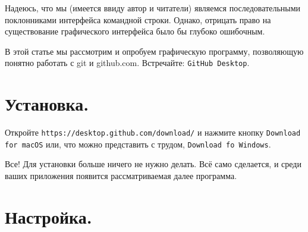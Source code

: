\documentclass[12pt,a4paper]{article}
\begin{document}
Надеюсь, что мы (имеется ввиду автор и читатели) являемся последовательными поклонниками
интерфейса командной строки. Однако, отрицать право на существование графического интерфейса было бы
глубоко ошибочным.

В этой статье мы рассмотрим и опробуем графическую программу, позволяющую понятно работать
с git и github.com. Встречайте: \texttt{GitHub Desktop}.

\section{Установка.}
Откройте \texttt{https://desktop.github.com/download/} и нажмите кнопку \texttt{Download for macOS}
 или, что можно представить с трудом, \texttt{Download fo Windows}.

Все! Для установки больше ничего не нужно делать. Всё само сделается, и среди ваших приложения
появится рассматриваемая далее программа.
\section{Настройка.}
\end{document}
